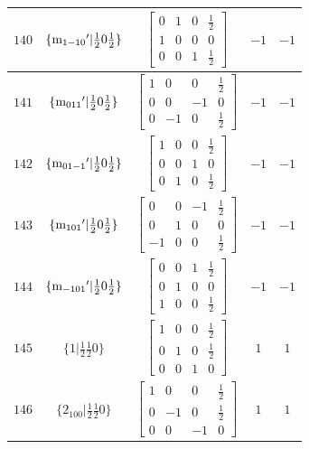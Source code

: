 \documentclass[fleqn,8pt]{jsarticle}
\begin{document}
\begin{longtable}{ccccc}
$ 140 $ & $ \{{\rm m}_{1-10}{}'|\frac{1}{2} 0 \frac{1}{2}\} $ & $ \begin{bmatrix} 0 & 1 & 0 & \frac{1}{2} \\ 1 & 0 & 0 & 0 \\ 0 & 0 & 1 & \frac{1}{2} \end{bmatrix} $ & $ -1 $ & $ -1 $ \\ \hline
$ 141 $ & $ \{{\rm m}_{011}{}'|\frac{1}{2} 0 \frac{1}{2}\} $ & $ \begin{bmatrix} 1 & 0 & 0 & \frac{1}{2} \\ 0 & 0 & -1 & 0 \\ 0 & -1 & 0 & \frac{1}{2} \end{bmatrix} $ & $ -1 $ & $ -1 $ \\ \hline
$ 142 $ & $ \{{\rm m}_{01-1}{}'|\frac{1}{2} 0 \frac{1}{2}\} $ & $ \begin{bmatrix} 1 & 0 & 0 & \frac{1}{2} \\ 0 & 0 & 1 & 0 \\ 0 & 1 & 0 & \frac{1}{2} \end{bmatrix} $ & $ -1 $ & $ -1 $ \\ \hline
$ 143 $ & $ \{{\rm m}_{101}{}'|\frac{1}{2} 0 \frac{1}{2}\} $ & $ \begin{bmatrix} 0 & 0 & -1 & \frac{1}{2} \\ 0 & 1 & 0 & 0 \\ -1 & 0 & 0 & \frac{1}{2} \end{bmatrix} $ & $ -1 $ & $ -1 $ \\ \hline
$ 144 $ & $ \{{\rm m}_{-101}{}'|\frac{1}{2} 0 \frac{1}{2}\} $ & $ \begin{bmatrix} 0 & 0 & 1 & \frac{1}{2} \\ 0 & 1 & 0 & 0 \\ 1 & 0 & 0 & \frac{1}{2} \end{bmatrix} $ & $ -1 $ & $ -1 $ \\ \hline
$ 145 $ & $ \{1|\frac{1}{2} \frac{1}{2} 0\} $ & $ \begin{bmatrix} 1 & 0 & 0 & \frac{1}{2} \\ 0 & 1 & 0 & \frac{1}{2} \\ 0 & 0 & 1 & 0 \end{bmatrix} $ & $ 1 $ & $ 1 $ \\ \hline
$ 146 $ & $ \{2{}_{100}|\frac{1}{2} \frac{1}{2} 0\} $ & $ \begin{bmatrix} 1 & 0 & 0 & \frac{1}{2} \\ 0 & -1 & 0 & \frac{1}{2} \\ 0 & 0 & -1 & 0 \end{bmatrix} $ & $ 1 $ & $ 1 $ \\ \hline

\end{longtable}
\end{document}
